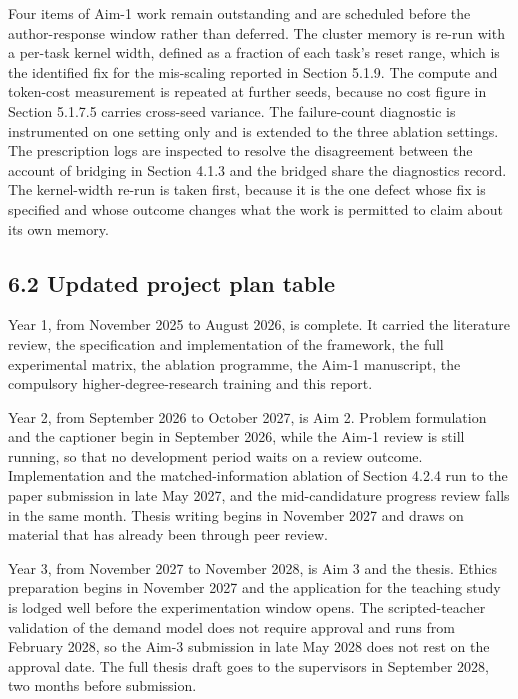 \documentclass[
  11pt,
]{article}
\begin{document}
Four items of Aim-1 work remain outstanding and are scheduled before the
author-response window rather than deferred. The cluster memory is
re-run with a per-task kernel width, defined as a fraction of each
task's reset range, which is the identified fix for the mis-scaling
reported in Section 5.1.9. The compute and token-cost measurement is
repeated at further seeds, because no cost figure in Section 5.1.7.5
carries cross-seed variance. The failure-count diagnostic is
instrumented on one setting only and is extended to the three ablation
settings. The prescription logs are inspected to resolve the
disagreement between the account of bridging in Section 4.1.3 and the
bridged share the diagnostics record. The kernel-width re-run is taken
first, because it is the one defect whose fix is specified and whose
outcome changes what the work is permitted to claim about its own
memory.

\hypertarget{updated-project-plan-table}{%
\subsection{6.2 Updated project plan
table}\label{updated-project-plan-table}}

Year 1, from November 2025 to August 2026, is complete. It carried the
literature review, the specification and implementation of the
framework, the full experimental matrix, the ablation programme, the
Aim-1 manuscript, the compulsory higher-degree-research training and
this report.

Year 2, from September 2026 to October 2027, is Aim 2. Problem
formulation and the captioner begin in September 2026, while the Aim-1
review is still running, so that no development period waits on a review
outcome. Implementation and the matched-information ablation of Section
4.2.4 run to the paper submission in late May 2027, and the
mid-candidature progress review falls in the same month. Thesis writing
begins in November 2027 and draws on material that has already been
through peer review.

Year 3, from November 2027 to November 2028, is Aim 3 and the thesis.
Ethics preparation begins in November 2027 and the application for the
teaching study is lodged well before the experimentation window opens.
The scripted-teacher validation of the demand model does not require
approval and runs from February 2028, so the Aim-3 submission in late
May 2028 does not rest on the approval date. The full thesis draft goes
to the supervisors in September 2028, two months before submission.
\end{document}

